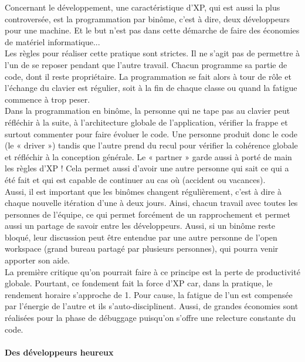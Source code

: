 \documentclass[]{article}
\let\oldparagraph\paragraph
\renewcommand{\paragraph}[1]{\oldparagraph{#1}\mbox{}}
\begin{document}
Concernant le développement, une caractéristique d'XP, qui est aussi la
plus controversée, est la programmation par binôme, c'est à dire, deux
développeurs pour une machine. Et le but n'est pas dans cette démarche
de faire des économies de matériel informatique...~\\
Les règles pour réaliser cette pratique sont strictes. Il ne s'agit pas
de permettre à l'un de se reposer pendant que l'autre travail. Chacun
programme sa partie de code, dont il reste propriétaire. La
programmation se fait alors à tour de rôle et l'échange du clavier est
régulier, soit à la fin de chaque classe ou quand la fatigue commence à
trop peser.~\\
Dans la programmation en binôme, la personne qui ne tape pas au clavier
peut réfléchir à la suite, à l'architecture globale de l'application,
vérifier la frappe et surtout commenter pour faire évoluer le code. Une
personne produit donc le code (le « driver ») tandis que l'autre prend
du recul pour vérifier la cohérence globale et réfléchir à la conception
générale. Le « partner » garde aussi à porté de main les règles d'XP !
Cela permet aussi d'avoir une autre personne qui sait ce qui a été fait
et qui est capable de continuer au cas où (accident ou vacances).\\
Aussi, il est important que les binômes changent régulièrement, c'est à
dire à chaque nouvelle itération d'une à deux jours. Ainsi, chacun
travail avec toutes les personnes de l'équipe, ce qui permet forcément
de un rapprochement et permet aussi un partage de savoir entre les
développeurs. Aussi, si un binôme reste bloqué, leur discussion peut
être entendue par une autre personne de l'open workspace (grand bureau
partagé par plusieurs personnes), qui pourra venir apporter son aide.\\
La première critique qu'on pourrait faire à ce principe est la perte de
productivité globale. Pourtant, ce fondement fait la force d'XP car,
dans la pratique, le rendement horaire s'approche de 1. Pour cause, la
fatigue de l'un est compensée par l'énergie de l'autre et ils
s'auto-disciplinent. Aussi, de grandes économies sont réalisées pour la
phase de débuggage puisqu'on s'offre une relecture constante du code.~




\hypertarget{des-duxe9veloppeurs-heureux}{%
\paragraph{Des développeurs heureux}\label{des-duxe9veloppeurs-heureux}}
\end{document}

